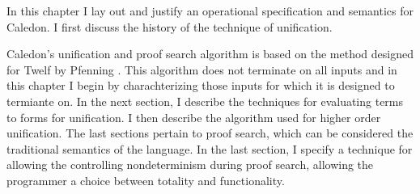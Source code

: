 In this chapter I lay out and justify an operational specification and semantics 
for Caledon.  I first discuss the history of the technique of unification.

Caledon's unification and proof search algorithm is based on the method designed for Twelf by Pfenning
\citep{pfenning1991logic}.  This algorithm does not terminate on all inputs and in this chapter 
I begin by charachterizing those inputs for which it is designed to termiante on.  In the next section, I describe
the techniques for evaluating terms to forms for unification.  I then describe the algorithm
used for higher order unification.  
The last sections pertain to proof search, which can be considered the traditional semantics of the language.
In the last section, I specify a technique for allowing the controlling nondeterminism during proof search, 
allowing the programmer a choice between totality and functionality.
